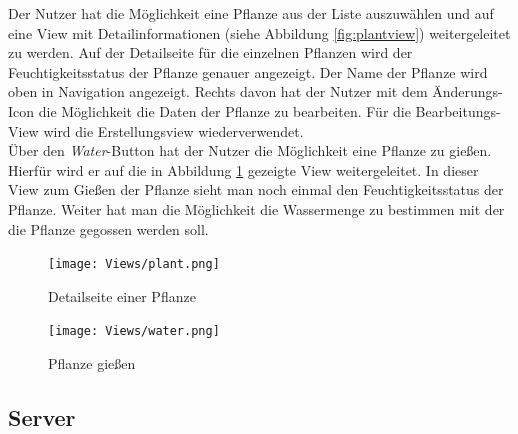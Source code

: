 Der Nutzer hat die Möglichkeit eine Pflanze aus der Liste auszuwählen und auf eine View mit Detailinformationen (siehe Abbildung \ref{fig:plantview}) weitergeleitet zu werden. Auf der Detailseite für die einzelnen Pflanzen wird der Feuchtigkeitsstatus der Pflanze genauer angezeigt. Der Name der Pflanze wird oben in Navigation angezeigt. Rechts davon hat der Nutzer mit dem Änderungs-Icon die Möglichkeit die Daten der Pflanze zu bearbeiten. Für die Bearbeitungs-View wird die Erstellungsview wiederverwendet.\\

Über den \textit{Water}-Button hat der Nutzer die Möglichkeit eine Pflanze zu gießen. Hierfür wird er auf die in Abbildung \ref{fig:watering} gezeigte View weitergeleitet. In dieser View zum Gießen der Pflanze sieht man noch einmal den Feuchtigkeitsstatus der Pflanze. Weiter hat man die Möglichkeit die Wassermenge zu bestimmen mit der die Pflanze gegossen werden soll. 

\begin{figure}[]
    \centering
    \begin{minipage}[b]{0.4\textwidth}
        \texttt{[image: Views/plant.png]}
        \caption{Detailseite einer Pflanze}
        \label{fig:plantview}
    \end{minipage}
    \hfill
    \begin{minipage}[b]{0.4\textwidth}
        \texttt{[image: Views/water.png]}
       \caption{Pflanze gießen}
       \label{fig:watering}
    \end{minipage}
\end{figure}



    \subsection{Server}

